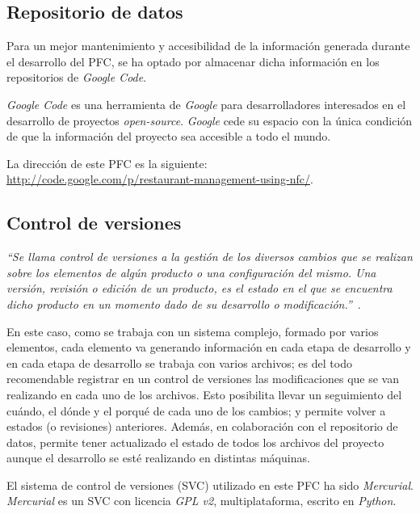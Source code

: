   \subsection{Repositorio de datos}
  Para un mejor mantenimiento y accesibilidad de la información generada
  durante el desarrollo del \acs{PFC}, se ha optado por almacenar dicha
  información en los repositorios de \emph{Google Code}.

  \emph{Google Code} es una herramienta de \emph{Google} para desarrolladores 
  interesados en el desarrollo de proyectos \emph{open-source}. \emph{Google}
  cede su espacio con la única condición de que la información del proyecto
  sea accesible a todo el mundo.

  La dirección de este \acs{PFC} es la siguiente:\\
  \url{http://code.google.com/p/restaurant-management-using-nfc/}.

  \subsection{Control de versiones}
  \emph{``Se llama control de versiones a la gestión de los diversos cambios 
  que se realizan sobre los elementos de algún producto o una configuración 
  del mismo. Una versión, revisión o edición de un producto, es el estado en 
  el que se encuentra dicho producto en un momento dado de su desarrollo o 
  modificación.''}~\cite{bib:wiki}.
  
  En este caso, como se trabaja con un sistema complejo, formado por varios 
  elementos, cada elemento va generando información en cada etapa de 
  desarrollo y en cada etapa de desarrollo se trabaja con varios archivos; es 
  del todo recomendable registrar en un control de versiones las modificaciones
  que se van realizando en cada uno de los archivos. Esto posibilita llevar
  un seguimiento del cuándo, el dónde y el porqué de cada uno de los cambios;
  y permite volver a estados (o revisiones) anteriores. Además, en colaboración
  con el repositorio de datos, permite tener actualizado el estado de 
  todos los archivos del proyecto aunque el desarrollo se esté realizando en 
  distintas máquinas.

  El sistema de control de versiones (\acs{SVC}) utilizado en este \acs{PFC}
  ha sido \emph{Mercurial}. \emph{Mercurial} es un \acs{SVC} con 
  licencia \emph{\acs{GPL} v2}, multiplataforma, escrito en \emph{Python}.

